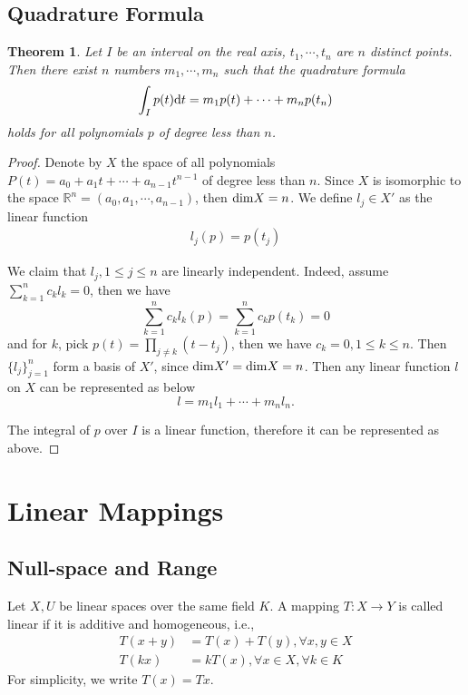 \documentclass[11pt]{book}
\newtheorem{theorem}{Theorem}[section]
\theoremstyle{definition}
\numberwithin{equation}{subsection}
\begin{document}
\medskip

\section{Quadrature Formula}
\begin{theorem}
Let $I$ be an interval on the real axis, $t_1, \cdots, t_n$ are $n$ distinct points. Then there exist $n$ numbers $m_1,\cdots,m_n$ such that the quadrature formula
\begin{align*}
    \int_I p(t) {\rm d}t = m_1 p(t) + \cdots + m_n p(t_n)
\end{align*}
holds for all polynomials $p$ of degree less than $n$.
\end{theorem}
\begin{proof}
Denote by $X$ the space of all polynomials $P(t) = a_0 + a_1 t +\cdots+ a_{n-1}t^{n-1}$ of degree less than $n$. Since $X$ is isomorphic to the space $\mathbb{R}^n = (a_0,a_1,\cdots,a_{n-1})$, then ${\rm dim}X = n$. We define $l_j\in X'$ as the linear function 
\begin{align*}
    l_j(p) = p(t_j)
\end{align*}

We claim that $l_j, 1\leq j \leq n$ are linearly independent. Indeed, assume $\sum^n_{k=1}c_k l_k = 0$, then we have 
$$\sum^n_{k=1}c_k l_k(p) = \sum^n_{k=1}c_k p(t_k) = 0$$
and for $k$, pick $p(t) = \prod_{j\neq k}(t - t_j)$, then we have $c_k = 0, 1\leq k\leq n$. Then $\{l_j\}^n_{j=1}$ form a basis of $X'$, since ${\rm dim}X' = {\rm dim}X = n$. Then any linear function $l$ on $X$ can be represented as below
$$l = m_1 l_1 + \cdots + m_n l_n.$$

The integral of $p$ over $I$ is a linear function, therefore it can be represented as above.
\end{proof}


\medskip

\chapter{Linear Mappings}
\section{Null-space and Range}

Let $X,U$ be linear spaces over the same field $K$. A mapping $T:X\to Y$ is called linear if it is additive and homogeneous, i.e.,
\begin{align*}
    T(x+y) &= T(x)+T(y), \forall x,y \in X\\
    T(k x) &= k T(x), \forall x\in X, \forall k\in K
\end{align*}
For simplicity, we write $T(x) = T x$.
\end{document}
